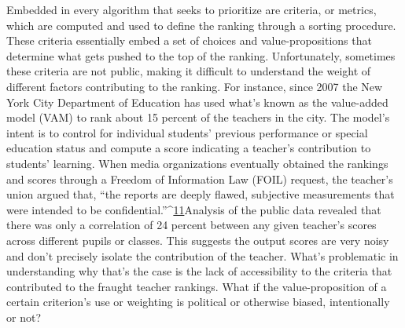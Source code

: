 Embedded in every algorithm that seeks to prioritize are criteria, or metrics, which are computed and used to define the ranking through a sorting procedure. These criteria essentially embed a set of choices and value-propositions that determine what gets pushed to the top of the ranking. Unfortunately, sometimes these criteria are not public, making it difficult to understand the weight of different factors contributing to the ranking. For instance, since 2007 the New York City Department of Education has used what's known as the value-added model (VAM) to rank about 15 percent of the teachers in the city. The model's intent is to control for individual students' previous performance or special education status and compute a score indicating a teacher's contribution to students' learning. When media organizations eventually obtained the rankings and scores through a Freedom of Information Law (FOIL) request, the teacher's union argued that, ``the reports are deeply flawed, subjective measurements that were intended to be confidential.''^{\href{#endnotes}{11}}Analysis of the public data revealed that there was only a correlation of 24 percent between any given teacher's scores across different pupils or classes. This suggests the output scores are very noisy and don't precisely isolate the contribution of the teacher. What's problematic in understanding why that's the case is the lack of accessibility to the criteria that contributed to the fraught teacher rankings. What if the value-proposition of a certain criterion's use or weighting is political or otherwise biased, intentionally or not? 
